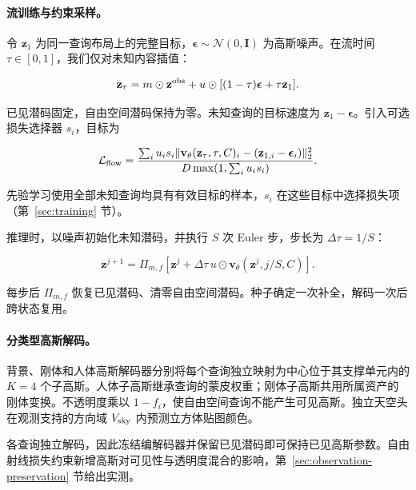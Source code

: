 \paragraph{流训练与约束采样。}

令 $\mathbf z_1$ 为同一查询布局上的完整目标，$\boldsymbol\epsilon\sim\mathcal N(0,\mathbf I)$ 为高斯噪声。在流时间 $\tau\in[0,1]$，我们仅对未知内容插值：

\begin{equation}
\mathbf z_\tau=m\odot\mathbf z^{\rm obs}
+u\odot[(1-\tau)\boldsymbol\epsilon+\tau\mathbf z_1].
\label{eq:flow-path}
\end{equation}

已见潜码固定，自由空间潜码保持为零。未知查询的目标速度为 $\mathbf z_1-\boldsymbol\epsilon$。引入可选损失选择器 $s_i$，目标为

\begin{equation}
\mathcal L_{\rm flow}=
\frac{\sum_i u_i s_i\|\mathbf v_\theta(\mathbf z_\tau,\tau,C)_i
-(\mathbf z_{1,i}-\boldsymbol\epsilon_i)\|_2^2}
{D\max(1,\sum_i u_i s_i)}.
\label{eq:flow-loss}
\end{equation}

先验学习使用全部未知查询均具有有效目标的样本，$s_i$ 在这些目标中选择损失项（第~\ref{sec:training} 节）。

推理时，以噪声初始化未知潜码，并执行 $S$ 次 Euler 步，步长为 $\Delta\tau=1/S$：

\begin{equation}
\mathbf z^{j+1}=\Pi_{m,f}\!\left[
\mathbf z^j+\Delta\tau\,u\odot
\mathbf v_\theta(\mathbf z^j,j/S,C)\right].
\label{eq:sampling}
\end{equation}

每步后 $\Pi_{m,f}$ 恢复已见潜码、清零自由空间潜码。种子确定一次补全，解码一次后跨状态复用。

\paragraph{分类型高斯解码。}
\label{sec:decoding}

背景、刚体和人体高斯解码器分别将每个查询独立映射为中心位于其支撑单元内的 $K=4$ 个子高斯。人体子高斯继承查询的蒙皮权重；刚体子高斯共用所属资产的刚体变换。不透明度乘以 $1-f_i$，使自由空间查询不能产生可见高斯。独立天空头在观测支持的方向域 $V_{\rm sky}$ 内预测立方体贴图颜色。

各查询独立解码，因此冻结编解码器并保留已见潜码即可保持已见高斯参数。自由射线损失约束新增高斯对可见性与透明度混合的影响，第~\ref{sec:observation-preservation} 节给出实测。

